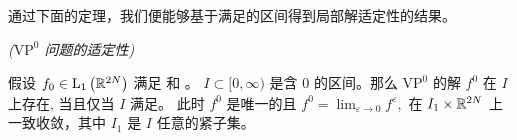 



通过下面的定理，我们便能够基于满足\boundcondition 的区间得到局部解适定性的结果。

\begin{theorem}\textit{($\text{VP}^0$ 问题的适定性)}

    假设 $f_{0} \in \mathrm{L}_{1}\left({\mathbb{R}}^{2 N}\right)$ 满足 \supremumf 和 \lipOffVsphere。 $I \subset [0, \infty)$ 是含 $0$ 的区间。那么 $\text{VP}^{0}$ 的解 $ f^{0}$ 在 $I$ 上存在, 当且仅当 $I$ 满足\boundcondition。 此时 $f^{0}$ 是唯一的且 $f^{0}=\lim_{\varepsilon\rightarrow 0} f^{\varepsilon},$ 在 $I_{1} \times {\mathbb{R}}^{2 N}$ 上一致收敛，其中 $I_{1}$ 是 $I$ 任意的紧子集。


\end{theorem}

